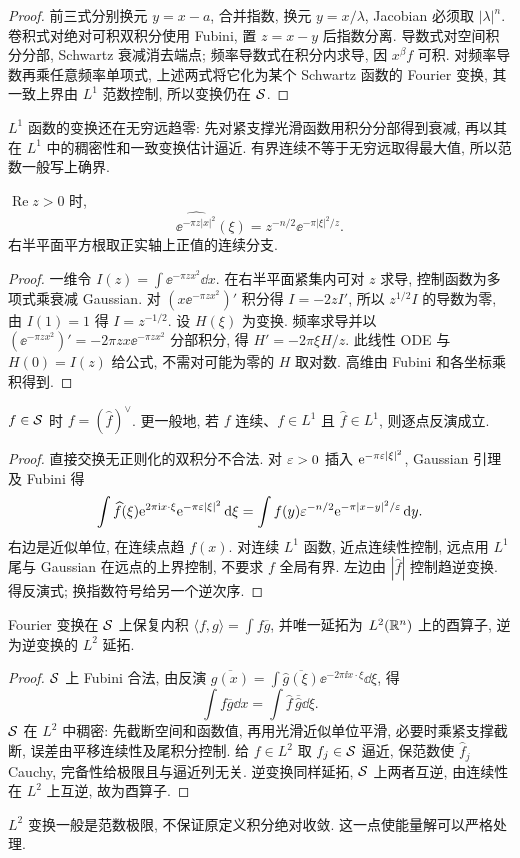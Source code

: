 \begin{proof}
前三式分别换元 $y=x-a$, 合并指数, 换元 $y=x/\lambda$, Jacobian 必须取 $|\lambda|^n$. 卷积式对绝对可积双积分使用 Fubini, 置 $z=x-y$ 后指数分离. 导数式对空间积分分部, Schwartz 衰减消去端点; 频率导数式在积分内求导, 因 $x^\beta f$ 可积. 对频率导数再乘任意频率单项式, 上述两式将它化为某个 Schwartz 函数的 Fourier 变换, 其一致上界由 $L^1$ 范数控制, 所以变换仍在 $\mathcal S$.
\end{proof}
$L^1$ 函数的变换还在无穷远趋零: 先对紧支撑光滑函数用积分分部得到衰减, 再以其在 $L^1$ 中的稠密性和一致变换估计逼近. 有界连续不等于无穷远取得最大值, 所以范数一般写上确界.
\begin{lemma}\label{lem:complexgaussian}
$\operatorname{Re}z>0$ 时,
\[
\widehat{\ee^{-\pi z|x|^2}}(\xi)=z^{-n/2}\ee^{-\pi|\xi|^2/z}.
\]
右半平面平方根取正实轴上正值的连续分支.
\end{lemma}
\begin{proof}
一维令 $I(z)=\int\ee^{-\pi z x^2}\dd x$. 在右半平面紧集内可对 $z$ 求导, 控制函数为多项式乘衰减 Gaussian. 对 $(x\ee^{-\pi z x^2})'$ 积分得 $I=-2zI'$, 所以 $z^{1/2}I$ 的导数为零, 由 $I(1)=1$ 得 $I=z^{-1/2}$. 设 $H(\xi)$ 为变换. 频率求导并以 $(\ee^{-\pi zx^2})'=-2\pi zx\ee^{-\pi zx^2}$ 分部积分, 得 $H'=-2\pi\xi H/z$. 此线性 ODE 与 $H(0)=I(z)$ 给公式, 不需对可能为零的 $H$ 取对数. 高维由 Fubini 和各坐标乘积得到.
\end{proof}
\begin{theorem}[Fourier 反演]\label{thm:inversion}
$f\in\mathcal S$ 时 $f=(\widehat f)^\vee$. 更一般地, 若 $f$ 连续、$f\in L^1$ 且 $\widehat f\in L^1$, 则逐点反演成立.
\end{theorem}
\begin{proof}
直接交换无正则化的双积分不合法. 对 $\varepsilon>0$ 插入 $\mathrm e^{-\pi\varepsilon|\xi|^2}$, Gaussian 引理及 Fubini 得
\[
\int\widehat f(\xi)\mathrm e^{2\pi\mathrm i x\cdot\xi}\mathrm e^{-\pi\varepsilon|\xi|^2}\,\mathrm d\xi
=\int f(y)\varepsilon^{-n/2}\mathrm e^{-\pi|x-y|^2/\varepsilon}\,\mathrm d y.
\]
右边是近似单位, 在连续点趋 $f(x)$. 对连续 $L^1$ 函数, 近点连续性控制, 远点用 $L^1$ 尾与 Gaussian 在远点的上界控制, 不要求 $f$ 全局有界. 左边由 $|\widehat f|$ 控制趋逆变换. 得反演式; 换指数符号给另一个逆次序.
\end{proof}
\begin{theorem}\label{thm:plancherel}
Fourier 变换在 $\mathcal S$ 上保复内积 $\langle f,g\rangle=\int f\overline g$, 并唯一延拓为 $L^2(\mathbb R^n)$ 上的酉算子, 逆为逆变换的 $L^2$ 延拓.
\end{theorem}
\begin{proof}
$\mathcal S$ 上 Fubini 合法, 由反演 $\overline{g(x)}=\int\overline{\widehat g(\xi)}\ee^{-2\pi\ii x\cdot\xi}\dd\xi$, 得
\[
\int f\overline g\dd x=\int\widehat f\,\overline{\widehat g}\dd\xi.
\]
$\mathcal S$ 在 $L^2$ 中稠密: 先截断空间和函数值, 再用光滑近似单位平滑, 必要时乘紧支撑截断, 误差由平移连续性及尾积分控制. 给 $f\in L^2$ 取 $f_j\in\mathcal S$ 逼近, 保范数使 $\widehat f_j$ Cauchy, 完备性给极限且与逼近列无关. 逆变换同样延拓, $\mathcal S$ 上两者互逆, 由连续性在 $L^2$ 上互逆, 故为酉算子.
\end{proof}
$L^2$ 变换一般是范数极限, 不保证原定义积分绝对收敛. 这一点使能量解可以严格处理.

